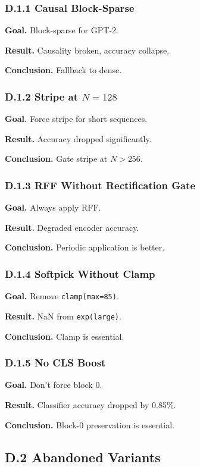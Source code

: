 \subsubsection{D.1.1 Causal Block-Sparse}

\textbf{Goal.} Block-sparse for GPT-2.

\textbf{Result.} Causality broken, accuracy collapse.

\textbf{Conclusion.} Fallback to dense.

\subsubsection{D.1.2 Stripe at $N=128$}

\textbf{Goal.} Force stripe for short sequences.

\textbf{Result.} Accuracy dropped significantly.

\textbf{Conclusion.} Gate stripe at $N > 256$.

\subsubsection{D.1.3 RFF Without Rectification Gate}

\textbf{Goal.} Always apply RFF.

\textbf{Result.} Degraded encoder accuracy.

\textbf{Conclusion.} Periodic application is better.

\subsubsection{D.1.4 Softpick Without Clamp}

\textbf{Goal.} Remove \texttt{clamp(max=85)}.

\textbf{Result.} NaN from \texttt{exp(large)}.

\textbf{Conclusion.} Clamp is essential.

\subsubsection{D.1.5 No CLS Boost}

\textbf{Goal.} Don't force block 0.

\textbf{Result.} Classifier accuracy dropped by 0.85\%.

\textbf{Conclusion.} Block-0 preservation is essential.

\subsection{D.2 Abandoned Variants}

